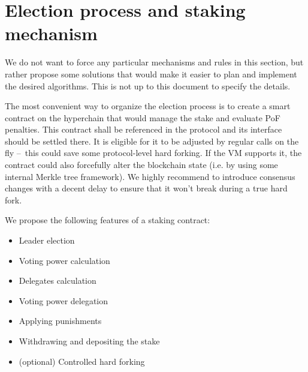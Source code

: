 \section{Election process and staking mechanism}

We do not want to force any particular mechanisms and rules in this section, but
rather propose some solutions that would make it easier to plan and implement
the desired algorithms. This is not up to this document to specify the details.

The most convenient way to organize the election process is to create a smart
contract on the hyperchain that would manage the stake and evaluate PoF
penalties. This contract shall be referenced in the protocol and its interface
should be settled there. It is eligible for it to be adjusted by regular calls on the fly
– this could save some protocol-level hard forking. If the VM supports it, the
contract could also forcefully alter the blockchain state (i.e. by using some
internal Merkle tree framework). We highly recommend to introduce consensus
changes with a decent delay to ensure that it won't break during a true hard fork.

We propose the following features of a staking contract:
\begin{itemize}
\item Leader election
\item Voting power calculation
\item Delegates calculation
\item Voting power delegation
\item Applying punishments
\item Withdrawing and depositing the stake
\item (optional) Controlled hard forking
\end{itemize}
